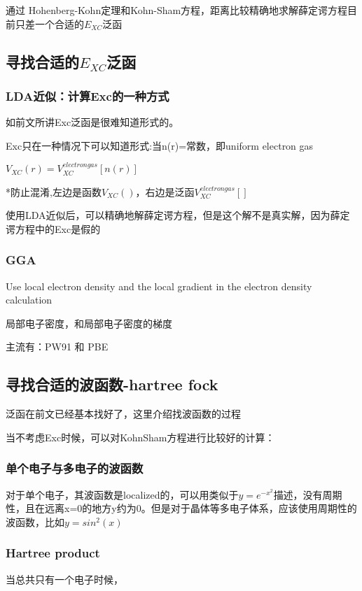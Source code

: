 \documentclass{article}
\begin{document}
通过 Hohenberg-Kohn定理和Kohn-Sham方程，距离比较精确地求解薛定谔方程目前只差一个合适的$E_{XC}$泛函

\subsection{寻找合适的$E_{XC}$泛函}

\subsubsection {LDA近似：计算Exc的一种方式}

如前文所讲Exc泛函是很难知道形式的。

Exc只在一种情况下可以知道形式:当n(r)=常数，即uniform electron gas

$V_{XC}(r)=V^{electron gas}_{XC}[n(r)]$

*防止混淆,左边是函数$V_{XC}()$，右边是泛函$V^{electron gas}_{XC}[]$

使用LDA近似后，可以精确地解薛定谔方程，但是这个解不是真实解，因为薛定谔方程中的Exc是假的

\subsubsection {GGA}

Use local electron density and the local gradient in the electron density calculation

局部电子密度，和局部电子密度的梯度

主流有：PW91 和 PBE

\subsection {寻找合适的波函数-hartree fock}

泛函在前文已经基本找好了，这里介绍找波函数的过程

当不考虑Exc时候，可以对KohnSham方程进行比较好的计算：

\subsubsection {单个电子与多电子的波函数}

对于单个电子，其波函数是localized的，可以用类似于$y=e^{-x^2}$描述，没有周期性，且在远离x=0的地方y约为0。但是对于晶体等多电子体系，应该使用周期性的波函数，比如$y=sin^2(x)$

\subsubsection {Hartree product}
当总共只有一个电子时候，
\end{document}
